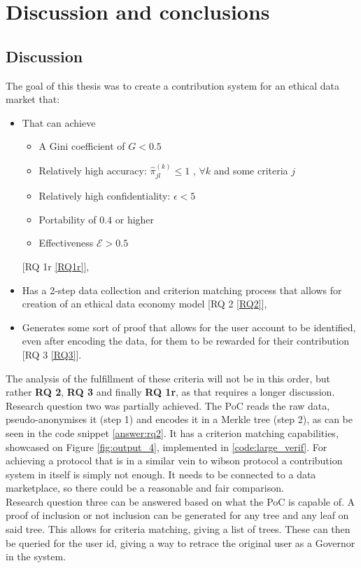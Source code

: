 \documentclass[a4paper,11pt]{report} %
\theoremstyle{change}
\theoremstyle{theoremstyle}
\begin{document}
\chapter{Discussion and conclusions}
\section{Discussion}
The goal of this thesis was to create a contribution system for an ethical data market that:
\begin{itemize}
    \item That can achieve 
    \begin{itemize}
        \item A Gini coefficient of $G < 0.5$
        \item Relatively high accuracy: $\hat{\pi}^{(k)}_{jl} \leq 1 \text{ , } \forall k$ and some criteria $j$
        \item Relatively high confidentiality: $\epsilon < 5$
        \item Portability of $0.4$ or higher
        \item Effectiveness $\mathcal{E} > 0.5$
    \end{itemize} [RQ 1r \ref{RQ1r}], 
    \item Has a 2-step data collection and criterion matching process that allows for creation of an ethical data economy model [RQ 2 \ref{RQ2}],
    \item Generates some sort of proof that allows for the user account to be identified, even after encoding the data, for them to be rewarded for their contribution [RQ 3 \ref{RQ3}].
\end{itemize}
The analysis of the fulfillment of these criteria will not be in this order, but rather \textbf{RQ 2}, \textbf{RQ 3} and finally \textbf{RQ 1r}, as that requires a longer discussion.\\
Research question two was partially achieved. The PoC reads the raw data, pseudo-anonymises it (step 1) and encodes it in a Merkle tree (step 2), as can be seen in the code snippet \ref{answer:rq2}. It has a criterion matching capabilities, showcased on Figure \ref{fig:output_4}, implemented in \ref{code:large_verif}. For achieving a protocol that is in a similar vein to wibson protocol a contribution system in itself is simply not enough. It needs to be connected to a data marketplace, so there could be a reasonable and fair comparison.\\
Research question three can be answered based on what the PoC is capable of. A proof of inclusion or not inclusion can be generated for any tree and any leaf on said tree. This allows for criteria matching, giving a list of trees. These can then be queried for the user id, giving a way to retrace the original user as a Governor in the system.\\
\end{document}
